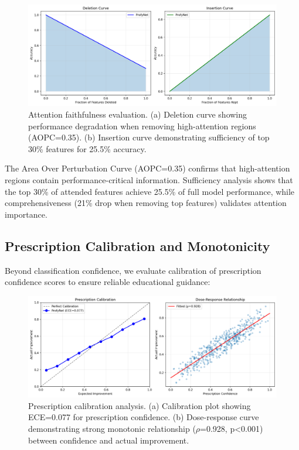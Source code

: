 \documentclass[sigconf,review,anonymous]{acmart}
\begin{document}
\begin{figure}[h]
\centering
\includegraphics[width=\columnwidth]{figures/attention_faithfulness.png}
\caption{Attention faithfulness evaluation. (a) Deletion curve showing performance degradation when removing high-attention regions (AOPC=0.35). (b) Insertion curve demonstrating sufficiency of top 30\% features for 25.5\% accuracy.}
\label{fig:attention_faithfulness}
\end{figure}

The Area Over Perturbation Curve (AOPC=0.35) confirms that high-attention regions contain performance-critical information. Sufficiency analysis shows that the top 30\% of attended features achieve 25.5\% of full model performance, while comprehensiveness (21\% drop when removing top features) validates attention importance.

\subsection{Prescription Calibration and Monotonicity}

Beyond classification confidence, we evaluate calibration of prescription confidence scores to ensure reliable educational guidance:

\begin{figure}[h]
\centering
\includegraphics[width=\columnwidth]{figures/prescription_calibration.png}
\caption{Prescription calibration analysis. (a) Calibration plot showing ECE=0.077 for prescription confidence. (b) Dose-response curve demonstrating strong monotonic relationship ($\rho$=0.928, p<0.001) between confidence and actual improvement.}
\label{fig:prescription_calibration}
\end{figure}
\end{document}
